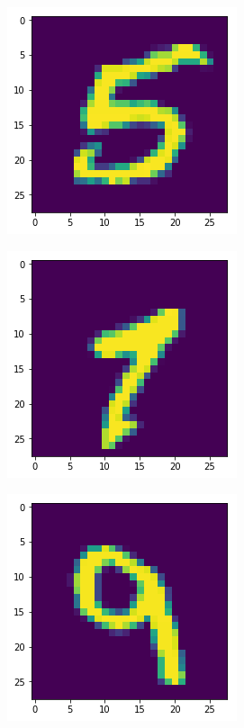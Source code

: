\begin{figure}[H]
\centering
\begin{subfigure}{.3\linewidth}
    \centering
    \includegraphics[scale=0.4]{chapter_3_figures/unseen_5.png}
\end{subfigure}
    \hfill
\begin{subfigure}{.3\linewidth}
    \centering
    \includegraphics[scale=0.4]{chapter_3_figures/unseen_7.png}
\end{subfigure}
   \hfill
\begin{subfigure}{.3\linewidth}
    \centering
    \includegraphics[scale=0.4]{chapter_3_figures/unseen_9.png}
\end{subfigure}


\end{figure}
